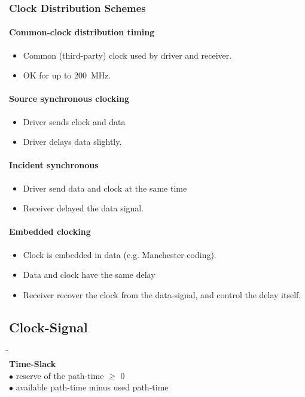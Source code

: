 \subsubsection{Clock Distribution Schemes}

\paragraph{Common-clock distribution timing}
\begin{itemize}
	\item Common (third-party) clock used by driver and receiver.
	\item  OK for up to \SI{200}{\mega\hertz}.
\end{itemize} 

\paragraph{Source synchronous clocking}
\begin{itemize}
	\item Driver sends clock and data
	\item Driver delays data slightly.
\end{itemize}

\paragraph{Incident synchronous}
\begin{itemize}
	\item Driver send data and clock at the same time
	\item Receiver delayed the data signal.
\end{itemize}


\paragraph{Embedded clocking}
\begin{itemize}
	\item Clock is embedded in data (e.g. Manchester coding).
	\item Data and clock have the same delay
	\item Receiver recover the clock from the data-signal, and control the delay itself.
\end{itemize}

\subsection{Clock-Signal}
\begin{tabbing}
	\hspace{10mm} \= \hspace{5mm} \= \\
	\textbf{Time-Slack}	 \hfill \\
						\>$\bullet$ \> reserve of the path-time $\geq$ 0 \\
						\>$\bullet$ \>available path-time minus used path-time 
\end{tabbing}
	
